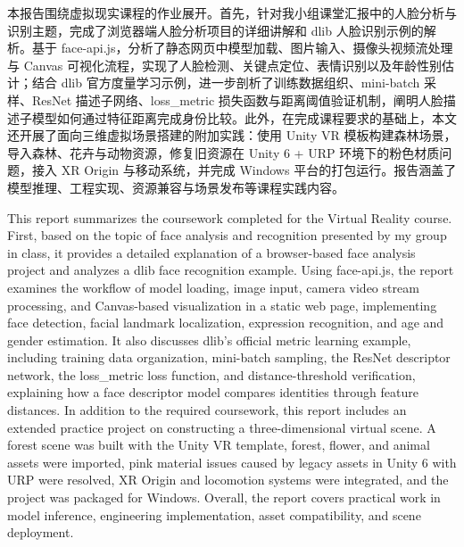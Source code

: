 \begin{abstractcn}
本报告围绕虚拟现实课程的作业展开。首先，针对我小组课堂汇报中的人脸分析与识别主题，完成了浏览器端人脸分析项目的详细讲解和 dlib 人脸识别示例的解析。基于 face-api.js，分析了静态网页中模型加载、图片输入、摄像头视频流处理与 Canvas 可视化流程，实现了人脸检测、关键点定位、表情识别以及年龄性别估计；结合 dlib 官方度量学习示例，进一步剖析了训练数据组织、mini-batch 采样、ResNet 描述子网络、loss\_metric 损失函数与距离阈值验证机制，阐明人脸描述子模型如何通过特征距离完成身份比较。此外，在完成课程要求的基础上，本文还开展了面向三维虚拟场景搭建的附加实践：使用 Unity VR 模板构建森林场景，导入森林、花卉与动物资源，修复旧资源在 Unity 6 + URP 环境下的粉色材质问题，接入 XR Origin 与移动系统，并完成 Windows 平台的打包运行。报告涵盖了模型推理、工程实现、资源兼容与场景发布等课程实践内容。

\end{abstractcn}

\begin{abstracten}
This report summarizes the coursework completed for the Virtual Reality course. First, based on the topic of face analysis and recognition presented by my group in class, it provides a detailed explanation of a browser-based face analysis project and analyzes a dlib face recognition example. Using face-api.js, the report examines the workflow of model loading, image input, camera video stream processing, and Canvas-based visualization in a static web page, implementing face detection, facial landmark localization, expression recognition, and age and gender estimation. It also discusses dlib's official metric learning example, including training data organization, mini-batch sampling, the ResNet descriptor network, the loss\_metric loss function, and distance-threshold verification, explaining how a face descriptor model compares identities through feature distances. In addition to the required coursework, this report includes an extended practice project on constructing a three-dimensional virtual scene. A forest scene was built with the Unity VR template, forest, flower, and animal assets were imported, pink material issues caused by legacy assets in Unity 6 with URP were resolved, XR Origin and locomotion systems were integrated, and the project was packaged for Windows. Overall, the report covers practical work in model inference, engineering implementation, asset compatibility, and scene deployment.

\end{abstracten}
